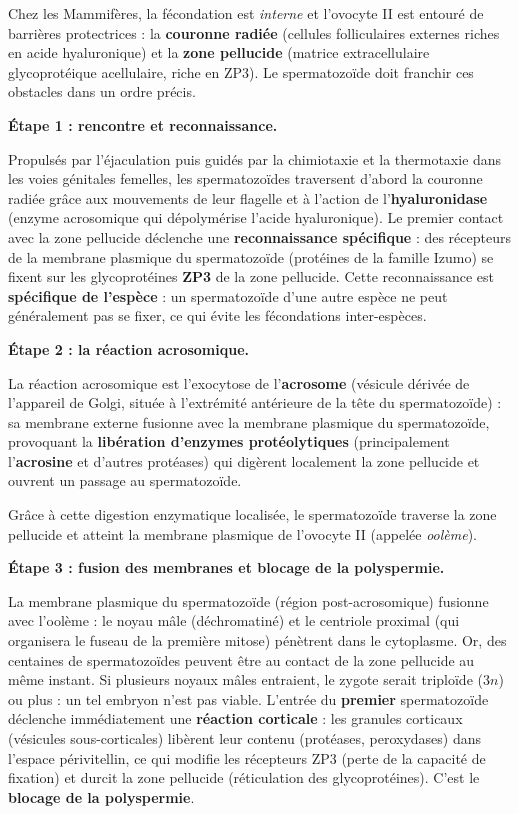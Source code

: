 \documentclass[11pt]{article}
\newcommand{\cle}[1]{{\popxbold\color{popdark}#1}}
\newcounter{popsec}
\newcounter{popsub}
\newcommand{\courssub}[1]{%
  \stepcounter{popsub}%
  \par\vspace{9pt}\noindent{\popxbold\fontsize{11.5}{13}\selectfont\color{popink}{\color{poporange}\thepopsec.\thepopsub}\hspace{6pt}#1}\par\nopagebreak\vspace{4pt}
}
\begin{document}
\courssub{Les étapes de la fécondation chez les Mammifères}

Chez les Mammifères, la fécondation est \emph{interne} et l'ovocyte II est entouré de barrières protectrices : la \textbf{couronne radiée} (cellules folliculaires externes riches en acide hyaluronique) et la \textbf{zone pellucide} (matrice extracellulaire glycoprotéique acellulaire, riche en ZP3). Le spermatozoïde doit franchir ces obstacles dans un ordre précis.

\textbf{Étape 1 : rencontre et reconnaissance.}\par
Propulsés par l'éjaculation puis guidés par la chimiotaxie et la thermotaxie dans les voies génitales femelles, les spermatozoïdes traversent d'abord la couronne radiée grâce aux mouvements de leur flagelle et à l'action de l'\textbf{hyaluronidase} (enzyme acrosomique qui dépolymérise l'acide hyaluronique). Le premier contact avec la \cle{zone pellucide} déclenche une \textbf{reconnaissance spécifique} : des récepteurs de la membrane plasmique du spermatozoïde (protéines de la famille Izumo) se fixent sur les glycoprotéines \textbf{ZP3} de la zone pellucide. Cette reconnaissance est \textbf{spécifique de l'espèce} : un spermatozoïde d'une autre espèce ne peut généralement pas se fixer, ce qui évite les fécondations inter-espèces.

\textbf{Étape 2 : la réaction acrosomique.}\par

\begin{definition}
La \cle{réaction acrosomique} est l'exocytose de l'\textbf{acrosome} (vésicule dérivée de l'appareil de Golgi, située à l'extrémité antérieure de la tête du spermatozoïde) : sa membrane externe fusionne avec la membrane plasmique du spermatozoïde, provoquant la \textbf{libération d'enzymes protéolytiques} (principalement l'\textbf{acrosine} et d'autres protéases) qui digèrent localement la zone pellucide et ouvrent un passage au spermatozoïde.
\end{definition}

Grâce à cette digestion enzymatique localisée, le spermatozoïde traverse la zone pellucide et atteint la membrane plasmique de l'ovocyte II (appelée \emph{oolème}).

\textbf{Étape 3 : fusion des membranes et blocage de la polyspermie.}\par
La membrane plasmique du spermatozoïde (région post-acrosomique) fusionne avec l'oolème : le noyau mâle (déchromatiné) et le centriole proximal (qui organisera le fuseau de la première mitose) pénètrent dans le cytoplasme. Or, des centaines de spermatozoïdes peuvent être au contact de la zone pellucide au même instant. Si plusieurs noyaux mâles entraient, le zygote serait triploïde ($3n$) ou plus : un tel embryon n'est pas viable. L'entrée du \textbf{premier} spermatozoïde déclenche immédiatement une \textbf{réaction corticale} : les granules corticaux (vésicules sous-corticales) libèrent leur contenu (protéases, peroxydases) dans l'espace périvitellin, ce qui modifie les récepteurs ZP3 (perte de la capacité de fixation) et durcit la zone pellucide (réticulation des glycoprotéines). C'est le \textbf{blocage de la polyspermie}.
\end{document}
